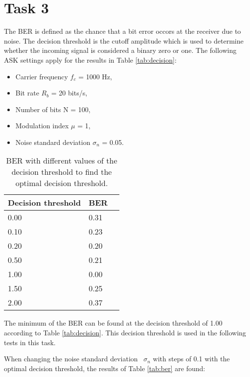\documentclass[final]{scrreprt} %
\begin{document}
\chapter{Task 3}
\label{task3}
The BER is defined as the chance that a bit error occors at the receiver due to noise. The decision threshold is the cutoff amplitude which is used to determine whether the incoming signal is considered a binary zero or one. The following ASK settings apply for the results in Table \ref{tab:decision}:

\begin{itemize}
    \item Carrier frequency $f_c$ = 1000 Hz,
    \item Bit rate $R_b$ = 20 bits/s,
    \item Number of bits N = 100,
    \item Modulation index $\mu$ = 1,
    \item Noise standard deviation $\sigma_n$ = 0.05.
\end{itemize}

\begin{table}[h]
\begin{center}
\begin{tabular}{ | l | l | l | }
    \hline
    Decision threshold & BER \\\hline
    0.00 & 0.31 \\\hline
    0.10 & 0.23 \\\hline
    0.20 & 0.20 \\\hline
    0.50 & 0.21 \\\hline
    1.00 & 0.00 \\\hline
    1.50 & 0.25 \\\hline
    2.00 & 0.37 \\\hline
\end{tabular}
\caption{BER with different values of the decision threshold to find the optimal decision threshold.}
\end{center}
\end{table}
\label{tab:decision}

The minimum of the BER can be found at the decision threshold of 1.00 according to Table \ref{tab:decision}. This decision threshold is used in the following tests in this task.

When changing the noise standard deviation ~$\sigma_n$ with steps of 0.1 with the optimal decision threshold, the results of Table \ref{tab:ber} are found:
\end{document}
